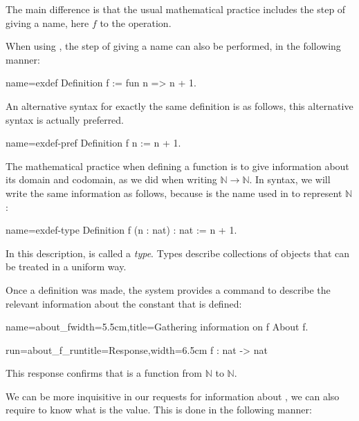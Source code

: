 The main difference is that the usual mathematical practice includes
the step of giving a name, here \(f\) to the operation.

When using \Coq{}, the step of giving a name can also be
performed, in the following manner:

\begin{coq}{name=exdef}{}
Definition f := fun n => n + 1.
\end{coq}
An alternative syntax for exactly the same definition is as follows,
this alternative syntax is actually preferred.

\begin{coq}{name=exdef-pref}{}
Definition f n := n + 1.
\end{coq}
The mathematical practice when defining a function is to give
information about its domain and codomain, as we did when writing
\({\mathbb{N}}\rightarrow{\mathbb{N}}\).  In \Coq{} syntax, we will write
the same information as follows, because  is the name used in
\Coq{} to represent \(\mathbb{N}\):

\begin{coq}{name=exdef-type}{}
Definition f (n : nat) : nat := n + 1.
\end{coq}
In this description,  is called a {\em type}.  Types describe
collections of objects that can be treated in a uniform way.

Once a definition was made, the \Coq{} system provides a command to
describe the relevant information about the constant that is defined:

\begin{coq}{name=about_f}{width=5.5cm,title=Gathering information on f}
About f.
\end{coq}
\begin{coqout}{run=about_f_run}{title=Response,width=6.5cm}
f : nat -> nat
\end{coqout}
This response confirms that  is a function from
\({\mathbb{N}}\) to \({\mathbb{N}}\).

We can be more inquisitive in our requests for information about
, we can also require to know what is the value.  This is done in
the following manner:

